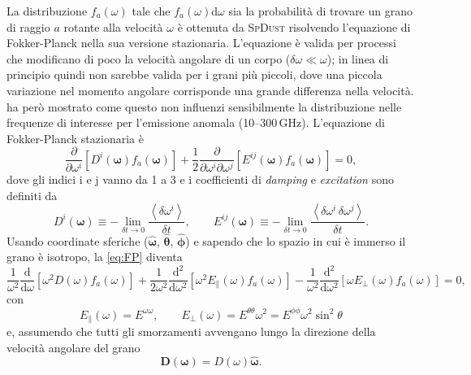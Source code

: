La distribuzione $f_a(\omega)$ tale che $f_a(\omega)$d$\omega$ sia la probabilità di trovare un grano di raggio $a$ rotante alla velocità $\omega$ è ottenuta da \textsc{SpDust} risolvendo l'equazione di Fokker-Planck nella sua versione stazionaria. L'equazione è valida per processi che modificano di poco la velocità angolare di un corpo ($\delta\omega\ll\omega$); in linea di principio quindi non sarebbe valida per i grani più piccoli, dove una piccola variazione nel momento angolare corrisponde una grande differenza nella velocità. \textcite{Ali} ha però mostrato come questo non influenzi sensibilmente la distribuzione nelle frequenze di interesse per l'emissione anomala (10--300\,GHz). L'equazione di Fokker-Planck stazionaria è
\begin{equation}
\label{eq:FP}
\frac{\partial}{\partial \omega^i}[ D^i(\boldsymbol{\omega}) f_a(\boldsymbol{\omega})] + \frac{1}{2} \frac{\partial}{\partial \omega^i \partial \omega^j} [E^{ij}(\boldsymbol{\omega}) f_a({\boldsymbol{\omega}})] = 0,
\end{equation}
dove gli indici i e j vanno da 1 a 3 e i coefficienti di \textit{damping} e \textit{excitation} sono definiti da
\begin{equation}
\label{eq:DE}
D^i(\boldsymbol{\omega})\equiv -\lim_{\delta t \to 0} \frac{\left\langle \delta \omega^i\right\rangle }{\delta t}, \qquad
E^{ij}(\boldsymbol{\omega})\equiv -\lim_{\delta t \to 0} \frac{\left\langle \delta \omega^i \, \delta\omega^j\right\rangle }{\delta t}.
\end{equation}
Usando coordinate sferiche ($\boldsymbol{\hat{\omega}}$, $\boldsymbol{\hat{\theta}}$, $\boldsymbol{\hat{\phi}}$) e sapendo che lo spazio in cui è immerso il grano è isotropo, la \ref{eq:FP} diventa
\begin{equation}
\label{eq:FP2}
\frac{1}{\omega^2} \frac{\mathrm{d}}{\mathrm{d}\omega} [\omega^2 D(\omega)f_a(\omega)] + \frac{1}{2\omega^2} \frac{\mathrm{d}^2}{\mathrm{d}\omega^2} [\omega^2 E_\parallel(\omega)f_a(\omega)] - \frac{1}{\omega^2}\frac{\mathrm{d}^2}{\mathrm{d}\omega^2} [\omega E_\perp(\omega)f_a(\omega)] = 0,
\end{equation}
con
\begin{equation}
E_\parallel(\omega) = E^{\omega \omega}, \qquad
E_\perp(\omega) = E^{\theta \theta} \omega^2 = E^{\phi \phi} \omega^2 \sin^2 \theta
\end{equation}
e, assumendo che tutti gli smorzamenti avvengano lungo la direzione della velocità angolare del grano
\begin{equation}
\boldsymbol{D}(\boldsymbol{\omega}) = D(\omega)\boldsymbol{\hat{\omega}}.
\end{equation}
